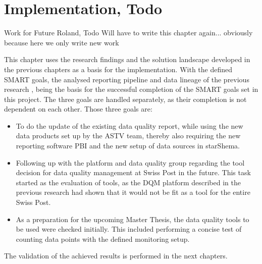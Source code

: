 \chapter{Implementation, Todo}
Work for Future Roland, Todo
Will have to write this chapter again... obviously because here we only write new work

This chapter uses the research findings and the solution landscape developed in the previous chapters as a basis for the implementation. With the defined SMART goals, the analysed reporting pipeline and data lineage of the previous research \cite{Roccaro2026_Project1}, being the basis for the successful completion of the SMART goals set in this project. The three goals are handled separately, as their completion is not dependent on each other. Those three goals are:

\begin{itemize}
    \item To do the update of the existing data quality report, while using the new data products set up by the ASTV team, thereby also requiring the new reporting software \gls{PBI} and the new setup of data sources in \gls{starShema}.

    \item Following up with the platform and data quality group regarding the tool decision for data quality management at Swiss Post in the future. This task started as the evaluation of tools, as the DQM platform described in the previous research \cite{Roccaro2026_Project1} had shown that it would not be fit as a tool for the entire Swiss Post.

    \item As a preparation for the upcoming Master Thesis, the data quality tools to be used were checked initially. This included performing a concise test of counting data points with the defined monitoring setup.
\end{itemize}

The validation of the achieved results is performed in the next chapters.




